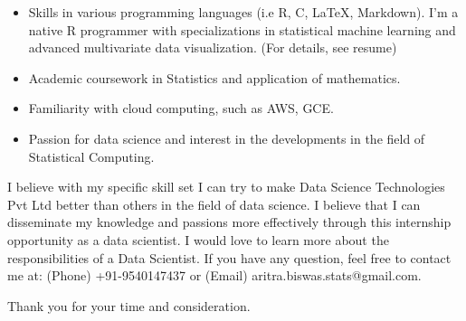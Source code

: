 \documentclass[11pt,a4paper,sans]{moderncv}        %
\begin{document}
\begin{itemize}
\item Skills in various programming languages (i.e R, C, LaTeX, Markdown). I'm a native R programmer with specializations in statistical machine learning 
and advanced multivariate data visualization. (For details, see resume)

\item Academic coursework in Statistics and application of mathematics.

\item Familiarity with cloud computing, such as AWS, GCE.

\item Passion for data science and interest in the developments in the field of Statistical Computing. \newline
\end{itemize}


I believe with my specific skill set I can try to make Data Science Technologies Pvt Ltd better than others in the field of data science. I believe that I can 
disseminate my knowledge and passions more effectively through this internship opportunity as a data scientist. I would love to learn more about the responsibilities 
of a Data Scientist. If you have any question, feel free to contact me at: (Phone) +91-9540147437 or (Email) aritra.biswas.stats@gmail.com.  \newline

Thank you for your time and consideration. \newline 


\makeletterclosing

\end{document}
